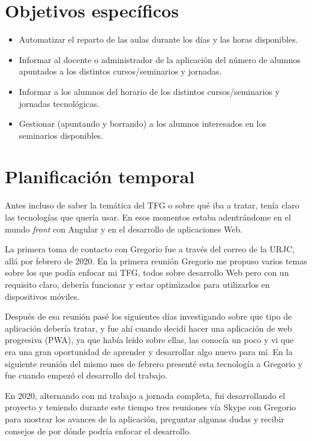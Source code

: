 \documentclass[a4paper, 12pt]{book}
\begin{document}
\section{Objetivos específicos}
\label{sec:objetivos-especificos}

\begin{itemize}
  \item Automatizar el reparto de las aulas durante los días y las horas disponibles.
  \item Informar al docente o administrador de la aplicación del número de alumnos apuntados a los distintos cursos/seminarios y jornadas.
  \item Informar a los alumnos del horario de los distintos cursos/seminarios y jornadas tecnológicas.
  \item Gestionar (apuntando y borrando) a los alumnos interesados en los seminarios disponibles.
\end{itemize}

\clearpage

\section{Planificación temporal}
\label{sec:planificacion-temporal}

Antes incluso de saber la temática del TFG o sobre qué iba a tratar, tenía claro las tecnologías que quería usar. En esos momentos estaba adentrándome en el mundo \emph{front} con Angular y en el desarrollo de aplicaciones Web.

La primera toma de contacto con Gregorio fue a través del correo de la URJC, allá por febrero de 2020. En la primera reunión Gregorio me propuso varios temas sobre los que podía enfocar mi TFG, todos sobre desarrollo Web pero con un requisito claro, debería funcionar y estar optimizados para utilizarlos en dispositivos móviles.

Después de esa reunión pasé los siguientes días investigando sobre que tipo de aplicación debería tratar, y fue ahí cuando decidí hacer una aplicación de web progresiva (PWA), ya que había leído sobre ellas, las conocía un poco y vi que era una gran oportunidad de aprender y desarrollar algo nuevo para mí. En la siguiente reunión del mismo mes de febrero presenté esta tecnología a Gregorio y fue cuando empezó el desarrollo del trabajo.

En 2020, alternando con mi trabajo a jornada completa, fui desarrollando el proyecto y teniendo durante este tiempo tres reuniones vía Skype con Gregorio para mostrar los avances de la aplicación, preguntar algunas dudas y recibir consejos de por dónde podría enfocar el desarrollo.
\end{document}
